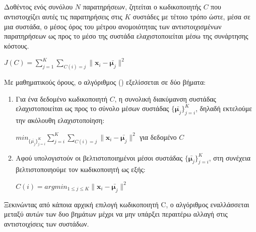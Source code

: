 \subsection{}
Δοθέντος ενός συνόλου $N$ παρατηρήσεων, ζητείται ο κωδικοποιητής $C$ που αντιστοιχίζει αυτές τις παρατηρήσεις στις $K$ συστάδες με τέτοιο τρόπο ώστε, μέσα σε μια συστάδα, ο μέσος όρος του μέτρου ανομοιότητας των αντιστοιχισμένων παρατηρήσεων ως προς το μέσο της συστάδα ελαχιστοποιείται μέσω της συνάρτησης κόστους.
\begin{center}
$J(C)= \sum_{j=1}^K \sum_{C(i)=j}\|\mathbf{x}_i-\bar{\mathbf{\mu}_j}\|^2$
\end{center}
Με μαθηματικούς όρους, ο αλγόριθμος () εξελίσσεται σε δύο βήματα:
\begin{enumerate}
\item Για ένα δεδομένο κωδικοποιητή $C$, η συνολική διακύμανση συστάδας ελαχιστοποιείται ως προς το σύνολο μέσων συστάδας $\{\bar{\mathbf{\mu}_j}\}_{j=i}^K$, δηλαδή εκτελούμε την ακόλουθη ελαχιστοποίηση:
\begin{center}
$ min_{\{\bar{\mu_j}\}_{j=i}^K} \sum_{j=i}^K \sum_{C(i)=j} \|\mathbf{x}_i-\bar{\mathbf{\mu}_j}\|^2$ για δεδομένο $C$
\end{center}
\item Αφού υπολογιστούν οι βελτιστοποιημένοι μέσοι συστάδας $\{\bar{\mathbf{\mu}_j}\}_{j=i}^K$, στη συνέχεια βελτιστοποιηούμε τον κωδικοποιητή ως εξής:
\begin{center}
$C(i) = arg min_{1 \leq j \leq K} \|\mathbf{x}_i-\bar{\mathbf{\mu}_j}\|^2$
\end{center}
\end{enumerate}
Ξεκινώντας από κάποια αρχική επιλογή κωδικοποιητή C, ο αλγόριθμος εναλλάσσεται μεταξύ αυτών των δυο βημάτων μέχρι να μην υπάρξει περαιτέρω αλλαγή στις αντιστοιχίσεις των συστάδων\cite{haykin}.
